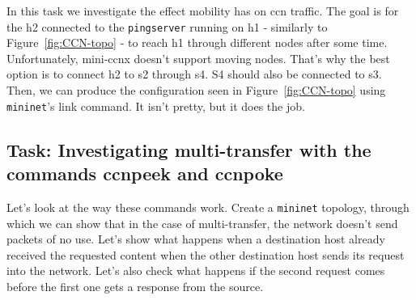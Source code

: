\documentclass[a4paper]{article}
\begin{document}
In this task we investigate the effect mobility has on ccn traffic. The goal is for the h2 connected
to the \verb!pingserver! running on h1 - similarly to Figure~\ref{fig:CCN-topo} - to reach h1 through different nodes after
some time. Unfortunately, mini-ccnx doesn't support moving nodes. That's why the best option is to
connect h2 to s2 through s4. S4 should also be connected to s3. Then, we can produce the configuration
seen in Figure~\ref{fig:CCN-topo} using \verb!mininet!'s link command. It isn't pretty, but it does the job.

\subsection{Task: Investigating multi-transfer with the commands ccnpeek and ccnpoke}

Let's look at the way these commands work. Create a \verb!mininet! topology, through which we can show that
in the case of multi-transfer, the network doesn't send packets of no use. Let's show what happens
when a destination host already received the requested content when the other destination host sends
its request into the network. Let's also check what happens if the second request comes before the
first one gets a response from the source.
\end{document}

